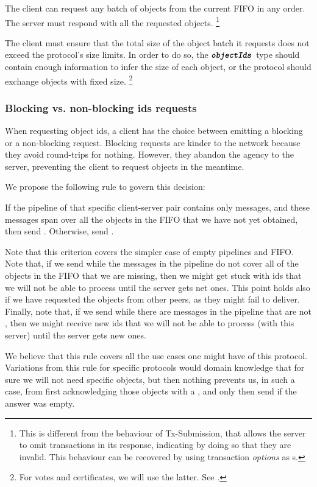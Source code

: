 The client can request any batch of objects from the current FIFO in any order.
The server must respond with all the requested objects.%
%
\footnote{This is different from the behaviour of Tx-Submission, that allows the
server to omit transactions in its response, indicating by doing so that they
are invalid. This behaviour can be recovered by using transaction {\em options}
as s.}

The client must ensure that the total size of the object batch it requests does not
exceed the protocol's size limits. In order to do so, the $\textbf{\texttt{\textit{objectIds}}}$ type
should contain enough information to infer the size of each object, or the protocol
should exchange objects with fixed size.%
%
\footnote{For votes and certificates, we will use the latter. See
.}

\subsubsection{Blocking vs. non-blocking ids requests}

When requesting object ids, a client has the choice between emitting a blocking or a non-blocking request.
Blocking requests are kinder to the network because they avoid round-trips for nothing.
However, they abandon the agency to the server, preventing the client to request objects in the meantime.

We propose the following rule to govern this decision:

If the pipeline of that specific client-server pair contains only \MsgRequestObjs{} messages, and these messages span over all the objects in the FIFO that we have not yet obtained, then send \MsgRequestObjIdsB. Otherwise, send \MsgRequestObjIdsNB.

Note that this criterion covers the simpler case of empty pipelines and FIFO.
Note that, if we send \MsgRequestObjIdsB{} while the messages in the pipeline do not cover all of the objects in the FIFO that we are missing, then we might get stuck with ids that we will not be able to process until the server gets net ones.
This point holds also if we have requested the objects from other peers, as they might fail to deliver.
Finally, note that, if we send \MsgRequestObjIdsB{} while there are messages in the pipeline that are not \MsgRequestObjs, then we might receive new ids that we will not be able to process (with this server) until the server gets new ones.

We believe that this rule covers all the use cases one might have of this protocol.
Variations from this rule for specific protocols would domain knowledge that for sure we will not need specific objects, but then nothing prevents us, in such a case, from first acknowledging those objects with a \MsgRequestObjIdsNB, and only then send \MsgRequestObjIdsB{} if the answer was empty.

